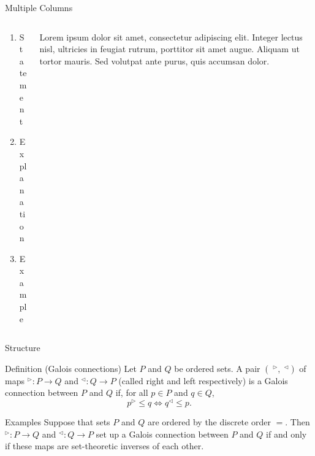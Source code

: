 \documentclass[aspectratio=169,xcolor=dvipsnames, t]{beamer}
\begin{document}
\begin{frame}{Multiple Columns}
    \begin{columns}
    \begin{column}{0.45\textwidth}
        \begin{enumerate}
            \item Statement
            \item Explanation
            \item Example
        \end{enumerate}
    \end{column}
    \begin{column}{0.45\textwidth}  %
        Lorem ipsum dolor sit amet, consectetur adipiscing elit. Integer lectus nisl, ultricies in feugiat rutrum, porttitor sit amet augue. Aliquam ut tortor mauris. Sed volutpat ante purus, quis accumsan dolor.
    \end{column}
    \end{columns}
\end{frame}

\begin{frame}{Structure}
    \begin{block}{Definition (Galois connections)}
        Let $P$ and $Q$ be ordered sets. A pair $(\;^\triangleright,\;^\triangleleft)$ of maps $^\triangleright: P \to Q$ and $^\triangleleft: Q \to P$ (called right and left respectively) is a Galois connection between $P$ and $Q$ if, for all $p \in P$ and $q \in Q$,
        \[p^\triangleright \leqslant q \Leftrightarrow q^\triangleleft \leqslant p.\]
    \end{block}
    \begin{exampleblock}{Examples}
        Suppose that sets $P$ and $Q$ are ordered by the discrete order $=$. Then $^{\triangleright}:P\to Q$ and $^{\triangleleft}:Q\to P$ set up a Galois connection between $P$ and $Q$ if and only if these maps are set-theoretic inverses of each other.
    \end{exampleblock}
\end{frame}
\end{document}
